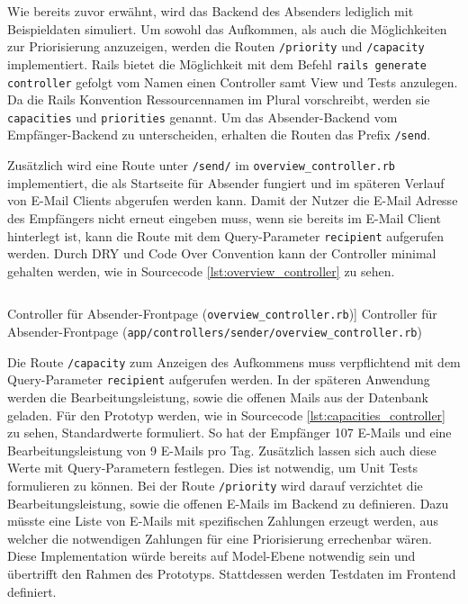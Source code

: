 Wie bereits zuvor erwähnt, wird das Backend des Absenders lediglich mit Beispieldaten simuliert. Um sowohl das Aufkommen, als auch die Möglichkeiten zur Priorisierung anzuzeigen, werden die Routen \texttt{/priority} und \texttt{/capacity} implementiert. Rails bietet die Möglichkeit mit dem Befehl \texttt{rails generate controller} gefolgt vom Namen einen Controller samt View und Tests anzulegen. Da die Rails Konvention Ressourcennamen im Plural vorschreibt, werden sie \texttt{capacities} und \texttt{priorities} genannt. Um das Absender-Backend vom Empfänger-Backend zu unterscheiden, erhalten die Routen das Prefix \texttt{/send}. 

Zusätzlich wird eine Route unter \texttt{/send/} im \texttt{overview\_controller.rb} implementiert, die als Startseite für Absender fungiert und im späteren Verlauf von E-Mail Clients abgerufen werden kann. Damit der Nutzer die E-Mail Adresse des Empfängers nicht erneut eingeben muss, wenn sie bereits im E-Mail Client hinterlegt ist, kann die Route mit dem Query-Parameter \texttt{recipient} aufgerufen werden. Durch DRY und Code Over Convention kann der Controller minimal gehalten werden, wie in Sourcecode \ref{lst:overview_controller} zu sehen.

\begin{listing}[!ht]
\inputminted[linenos]{ruby}{Listings/overview_controller.rb}

\caption
    [Controller für Absender-Frontpage (\texttt{overview\_controller.rb})]
    {Controller für Absender-Frontpage (\texttt{app/controllers/sender/overview\_controller.rb})}
    
\label{lst:overview_controller}
\end{listing}

\noindent Die Route \texttt{/capacity} zum Anzeigen des Aufkommens muss verpflichtend mit dem Query-Parameter \texttt{recipient} aufgerufen werden. In der späteren Anwendung werden die Bearbeitungsleistung, sowie die offenen Mails aus der Datenbank geladen. Für den Prototyp werden, wie in Sourcecode \ref{lst:capacities_controller} zu sehen, Standardwerte formuliert. So hat der Empfänger 107 E-Mails und eine Bearbeitungsleistung von 9 E-Mails pro Tag. Zusätzlich lassen sich auch diese Werte mit Query-Parametern festlegen. Dies ist notwendig, um Unit Tests formulieren zu können. Bei der Route \texttt{/priority} wird darauf verzichtet die Bearbeitungsleistung, sowie die offenen E-Mails im Backend zu definieren. Dazu müsste eine Liste von E-Mails mit spezifischen Zahlungen erzeugt werden, aus welcher die notwendigen Zahlungen für eine Priorisierung errechenbar wären. Diese Implementation würde bereits auf Model-Ebene notwendig sein und übertrifft den Rahmen des Prototyps. Stattdessen werden Testdaten im Frontend definiert.  

